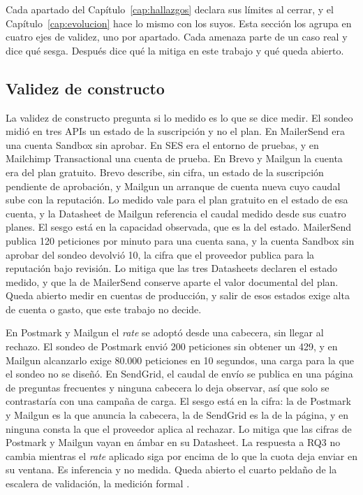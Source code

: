 Cada apartado del Capítulo~\ref{cap:hallazgos} declara sus límites al cerrar, y el Capítulo~\ref{cap:evolucion} hace lo mismo con los suyos.
Esta sección los agrupa en cuatro ejes de validez, uno por apartado.
Cada amenaza parte de un caso real y dice qué sesga.
Después dice qué la mitiga en este trabajo y qué queda abierto.

\subsection{Validez de constructo}\label{sec:conclusiones:constructo}

La validez de constructo pregunta si lo medido es lo que se dice medir.
El sondeo midió en tres APIs un estado de la suscripción y no el plan.
En MailerSend era una cuenta Sandbox sin aprobar.
En SES era el entorno de pruebas, y en Mailchimp Transactional una cuenta de prueba.
En Brevo y Mailgun la cuenta era del plan gratuito.
Brevo describe, sin cifra, un estado de la suscripción pendiente de aprobación, y Mailgun un arranque de cuenta nueva cuyo caudal sube con la reputación.
Lo medido vale para el plan gratuito en el estado de esa cuenta, y la Datasheet de Mailgun referencia el caudal medido desde sus cuatro planes.
El sesgo está en la capacidad observada, que es la del estado.
MailerSend publica 120 peticiones por minuto para una cuenta sana, y la cuenta Sandbox sin aprobar del sondeo devolvió 10, la cifra que el proveedor publica para la reputación bajo revisión.
Lo mitiga que las tres Datasheets declaren el estado medido, y que la de MailerSend conserve aparte el valor documental del plan.
Queda abierto medir en cuentas de producción, y salir de esos estados exige alta de cuenta o gasto, que este trabajo no decide.

En Postmark y Mailgun el \textit{rate} se adoptó desde una cabecera, sin llegar al rechazo.
El sondeo de Postmark envió 200 peticiones sin obtener un 429, y en Mailgun alcanzarlo exige 80.000 peticiones en 10 segundos, una carga para la que el sondeo no se diseñó.
En SendGrid, el caudal de envío se publica en una página de preguntas frecuentes y ninguna cabecera lo deja observar, así que solo se contrastaría con una campaña de carga.
El sesgo está en la cifra: la de Postmark y Mailgun es la que anuncia la cabecera, la de SendGrid es la de la página, y en ninguna consta la que el proveedor aplica al rechazar.
Lo mitiga que las cifras de Postmark y Mailgun vayan en ámbar en su Datasheet.
La respuesta a RQ3 no cambia mientras el \textit{rate} aplicado siga por encima de lo que la cuota deja enviar en su ventana.
Es inferencia y no medida.
Queda abierto el cuarto peldaño de la escalera de validación, la medición formal \citep{datasheetusagetesting}.

